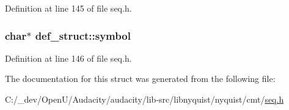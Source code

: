 Definition at line 145 of file seq.\+h.

\subsubsection[{\texorpdfstring{symbol}{symbol}}]{\setlength{\rightskip}{0pt plus 5cm}char$\ast$ def\+\_\+struct\+::symbol}\hypertarget{structdef__struct_a1e3dda443ba48aa800b809866f0b2e24}{}\label{structdef__struct_a1e3dda443ba48aa800b809866f0b2e24}


Definition at line 146 of file seq.\+h.



The documentation for this struct was generated from the following file\+:\begin{DoxyCompactItemize}
\item 
C\+:/\+\_\+dev/\+Open\+U/\+Audacity/audacity/lib-\/src/libnyquist/nyquist/cmt/\hyperlink{seq_8h}{seq.\+h}\end{DoxyCompactItemize}

